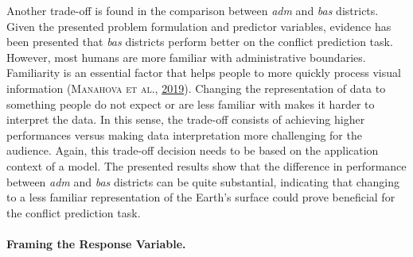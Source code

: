 \documentclass[a4paper,11pt]{article}
\begin{document}
Another trade-off is found in the comparison between \emph{adm} and \emph{bas} districts.
Given the presented problem formulation and predictor variables, evidence has been
presented that \emph{bas} districts perform better on the conflict prediction task.
However, most humans are more familiar with administrative boundaries. Familiarity
is an essential factor that helps people to more quickly process visual information
\textsc{(\textnormal{\textsc{Manahova} \textsc{et al.}}, \textnormal{\protect\hyperlink{ref-manahova2019}{2019}})}. Changing the representation of data to something people do not
expect or are less familiar with makes it harder to interpret the data. In this
sense, the trade-off consists of achieving higher performances versus making data
interpretation more challenging for the audience. Again, this trade-off decision
needs to be based on the application context of a model. The presented results
show that the difference in performance between \emph{adm} and \emph{bas} districts can be
quite substantial, indicating that changing to a less familiar representation of
the Earth's surface could prove beneficial for the conflict prediction task.

\hypertarget{framing-the-response-variable.}{%
\paragraph{Framing the Response Variable.}\label{framing-the-response-variable.}}
\end{document}
